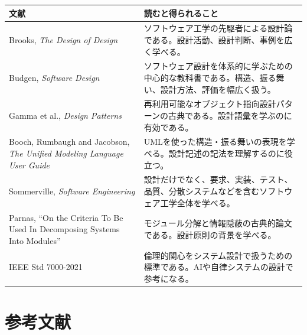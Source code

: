 \documentclass[10.5pt,a4paper]{ltjsarticle}
\begin{document}
\begin{tabularx}{\linewidth}{L{52mm}Y}
\toprule
\textbf{文献} & \textbf{読むと得られること} \\
\midrule
Brooks, \textit{The Design of Design} & ソフトウェア工学の先駆者による設計論である。設計活動、設計判断、事例を広く学べる。 \\
Budgen, \textit{Software Design} & ソフトウェア設計を体系的に学ぶための中心的な教科書である。構造、振る舞い、設計方法、評価を幅広く扱う。 \\
Gamma et al., \textit{Design Patterns} & 再利用可能なオブジェクト指向設計パターンの古典である。設計語彙を学ぶのに有効である。 \\
Booch, Rumbaugh and Jacobson, \textit{The Unified Modeling Language User Guide} & UMLを使った構造・振る舞いの表現を学べる。設計記述の記法を理解するのに役立つ。 \\
Sommerville, \textit{Software Engineering} & 設計だけでなく、要求、実装、テスト、品質、分散システムなどを含むソフトウェア工学全体を学べる。 \\
Parnas, “On the Criteria To Be Used In Decomposing Systems Into Modules” & モジュール分解と情報隠蔽の古典的論文である。設計原則の背景を学べる。 \\
IEEE Std 7000-2021 & 倫理的関心をシステム設計で扱うための標準である。AIや自律システムの設計で参考になる。 \\
\bottomrule
\end{tabularx}

\section{参考文献}
\end{document}
